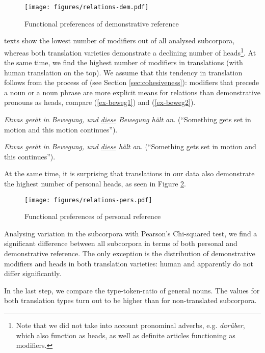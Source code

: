 \documentclass[output=paper]{langsci/langscibook.cls}
\begin{document}
\begin{figure}

\texttt{[image: figures/relations-dem.pdf]}
\caption{Functional preferences of demonstrative reference}
\label{fig:demfunc}
\end{figure}

 texts show the lowest number of modifiers out of all analysed subcorpora, whereas both translation varieties demonstrate a declining number of heads\footnote{Note that we did not take into account pronominal adverbs, e.g.  \textsl{dar\"uber}, which also function as heads, as well as definite articles functioning as modifiers.}. At the same time, we find the highest number of modifiers in translations (with human translation on the top). We assume that this tendency in translation follows from the process of  (see Section \ref{sec:cohesiveness}): modifiers that precede a noun or a noun phrase are more explicit means for  relations than demonstrative pronouns as heads, compare (\ref{ex-beweg1}) and (\ref{ex-beweg2}).

\ea
\label{ex-beweg1}
 \textsl{Etwas ger\"at in Bewegung, und \underline{diese} Bewegung h\"alt an.} (``Something gets set in motion and this motion continues'').
\z

\ea 
\label{ex-beweg2}
 \textsl{Etwas ger\"at in Bewegung, und \underline{diese} h\"alt an.}  (``Something gets set in motion and this continues'').
\z

At the same time, it is surprising that translations in our data also demonstrate the highest number of personal heads, as seen in Figure \ref{fig:persfunc}.

\begin{figure}

\texttt{[image: figures/relations-pers.pdf]}
\caption{Functional preferences of personal reference}
\label{fig:persfunc}
\end{figure}

Analysing variation in the subcorpora with Pearson's Chi-squared test, we find a significant difference between all subcorpora in terms of both personal and demonstrative reference. The only exception is the distribution of demonstrative modifiers and heads in both translation varieties: human and  apparently do not differ significantly.

In the last step, we compare the type-token-ratio of general nouns. The values for both translation types turn out to be higher than for non-translated subcorpora. 
\end{document}

